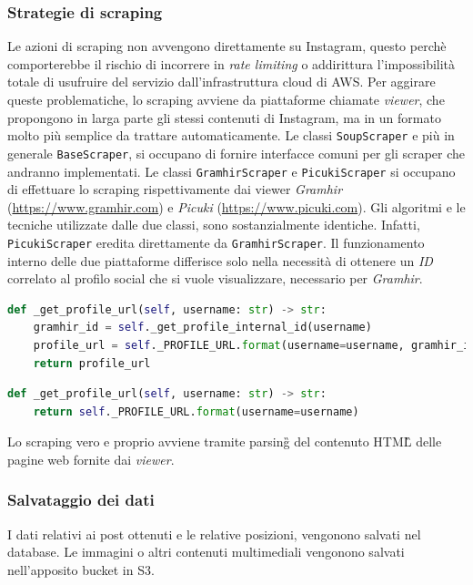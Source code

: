 \subsubsection{Strategie di scraping}
Le azioni di scraping non avvengono direttamente su Instagram, questo perchè comporterebbe il
rischio di incorrere in \textit{rate limiting} o addirittura l'impossibilità totale di usufruire del servizio dall'infrastruttura cloud di AWS.
Per aggirare queste problematiche, lo scraping avviene da piattaforme chiamate \textit{viewer},
che propongono in larga parte gli stessi contenuti di Instagram, ma in un formato molto più semplice da trattare automaticamente.\aCapo
Le classi \verb|SoupScraper| e più in generale \verb|BaseScraper|, si occupano di fornire interfacce comuni per gli scraper che andranno implementati.
Le classi \verb|GramhirScraper| e \verb|PicukiScraper| si occupano di effettuare lo scraping 
rispettivamente dai viewer \textit{Gramhir} (\url{https://www.gramhir.com}) e \textit{Picuki} (\url{https://www.picuki.com}). Gli algoritmi e le tecniche utilizzate dalle due classi, sono sostanzialmente identiche.
Infatti, \verb|PicukiScraper| eredita direttamente da \verb|GramhirScraper|.
Il funzionamento interno delle due piattaforme differisce solo nella necessità di ottenere un 
\textit{ID} correlato al profilo social che si vuole visualizzare, necessario per \textit{Gramhir}.

\begin{lstlisting}[language=Python, caption=Ottenimento URL profilo in \textit{Gramhir}]
def _get_profile_url(self, username: str) -> str:
    gramhir_id = self._get_profile_internal_id(username)
    profile_url = self._PROFILE_URL.format(username=username, gramhir_id=gramhir_id)
    return profile_url
\end{lstlisting}

\begin{lstlisting}[language=Python, caption=Ottenimento URL profilo in \textit{Picuki}]
def _get_profile_url(self, username: str) -> str:
    return self._PROFILE_URL.format(username=username)
\end{lstlisting}

Lo scraping vero e proprio avviene tramite parsing\G{} del contenuto HTML\G{} delle pagine web
fornite dai \textit{viewer}.

\subsubsection{Salvataggio dei dati}
I dati relativi ai post ottenuti e le relative posizioni, vengonono salvati nel database.
Le immagini o altri contenuti multimediali vengonono salvati nell'apposito bucket in S3.
